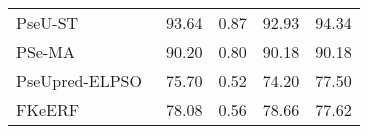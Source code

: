 \begin{tabular}{lcccc}
  PseU-ST~\cite{zhang_pseu-st_2023}              & 93.64             & 0.87         & 92.93            & 94.34            \\
  PSe-MA~\cite{patil_novel_2023}                 & 90.20             & 0.80         & 90.18            & 90.18            \\
  PseUpred-ELPSO~\cite{wang_pseupred-elpso_2024} & 75.70             & 0.52         & 74.20            & 77.50            \\
  FKeERF~\cite{chen_fuzzy_2024}                  & 78.08             & 0.56         & 78.66            & 77.62            \\
  \bottomrule
\end{tabular}